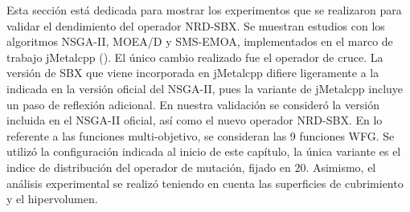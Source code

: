 Esta sección está dedicada para mostrar los experimentos que se realizaron para validar el dendimiento del operador NRD-SBX.
%
Se muestran estudios con los algoritmos NSGA-II, MOEA/D y SMS-EMOA, implementados en el marco de trabajo jMetalcpp (\cite{Joel:jMetal}).
%
El único cambio realizado fue el operador de cruce.
%
La versión de SBX que viene incorporada en jMetalcpp difiere ligeramente a la indicada en la versión oficial del NSGA-II, pues la variante de jMetalcpp incluye un paso de reflexión adicional.
%
En nuestra validación se consideró la versión incluida en el NSGA-II oficial, así como el nuevo operador NRD-SBX.
%
En lo referente a las funciones multi-objetivo, se consideran las 9 funciones WFG. 
%
Se utilizó la configuración indicada al inicio de este capítulo, la única variante es el indice de distribución del operador de mutación, fijado en $20$.
%
Asimismo, el análisis experimental se realizó teniendo en cuenta las superficies de cubrimiento y el hipervolumen.

